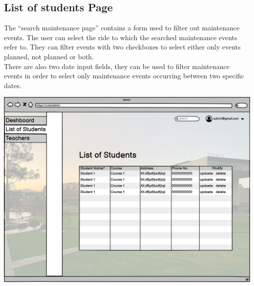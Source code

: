 \subsection{List of students Page}
The “search maintenance page” contains a form used to filter out maintenance events. The user can select the ride to which the searched maintenance events refer to. They can filter events with two checkboxes to select either only events planned, not planned or both.\\

There are also two date input fields, they can be used to filter maintenance events in order to select only maintenance events occurring between two specific dates.


\includegraphics[width=\columnwidth]{images/List of Students.png}
